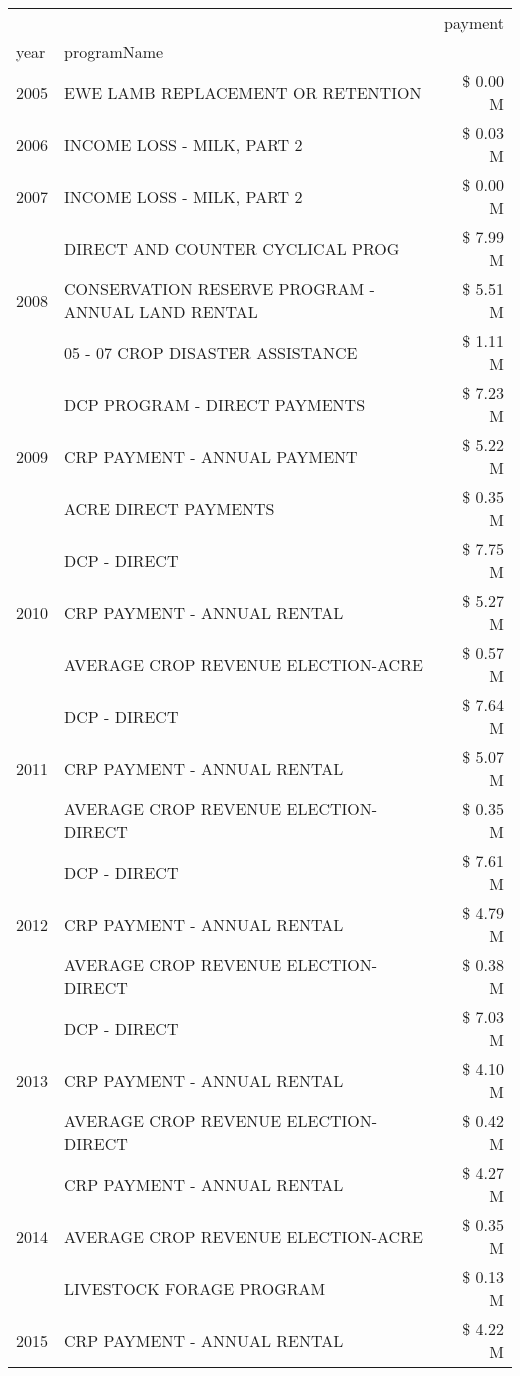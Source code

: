 \begin{tabular}{llr}
\toprule
 &  & payment \\
year & programName &  \\
\midrule
2005 & EWE LAMB REPLACEMENT OR RETENTION & \$ 0.00 M \\
\cline{1-3}
2006 & INCOME LOSS - MILK, PART 2 & \$ 0.03 M \\
\cline{1-3}
2007 & INCOME LOSS - MILK, PART 2 & \$ 0.00 M \\
\cline{1-3}
\multirow[t]{3}{*}{2008} & DIRECT AND COUNTER CYCLICAL PROG & \$ 7.99 M \\
 & CONSERVATION RESERVE PROGRAM - ANNUAL LAND RENTAL & \$ 5.51 M \\
 & 05 - 07 CROP DISASTER ASSISTANCE & \$ 1.11 M \\
\cline{1-3}
\multirow[t]{3}{*}{2009} & DCP PROGRAM - DIRECT PAYMENTS & \$ 7.23 M \\
 & CRP PAYMENT - ANNUAL PAYMENT & \$ 5.22 M \\
 & ACRE DIRECT PAYMENTS & \$ 0.35 M \\
\cline{1-3}
\multirow[t]{3}{*}{2010} & DCP - DIRECT & \$ 7.75 M \\
 & CRP PAYMENT - ANNUAL RENTAL & \$ 5.27 M \\
 & AVERAGE CROP REVENUE ELECTION-ACRE & \$ 0.57 M \\
\cline{1-3}
\multirow[t]{3}{*}{2011} & DCP - DIRECT & \$ 7.64 M \\
 & CRP PAYMENT - ANNUAL RENTAL & \$ 5.07 M \\
 & AVERAGE CROP REVENUE ELECTION-DIRECT & \$ 0.35 M \\
\cline{1-3}
\multirow[t]{3}{*}{2012} & DCP - DIRECT & \$ 7.61 M \\
 & CRP PAYMENT - ANNUAL RENTAL & \$ 4.79 M \\
 & AVERAGE CROP REVENUE ELECTION-DIRECT & \$ 0.38 M \\
\cline{1-3}
\multirow[t]{3}{*}{2013} & DCP - DIRECT & \$ 7.03 M \\
 & CRP PAYMENT - ANNUAL RENTAL & \$ 4.10 M \\
 & AVERAGE CROP REVENUE ELECTION-DIRECT & \$ 0.42 M \\
\cline{1-3}
\multirow[t]{3}{*}{2014} & CRP PAYMENT - ANNUAL RENTAL & \$ 4.27 M \\
 & AVERAGE CROP REVENUE ELECTION-ACRE & \$ 0.35 M \\
 & LIVESTOCK FORAGE PROGRAM & \$ 0.13 M \\
\cline{1-3}
\multirow[t]{3}{*}{2015} & CRP PAYMENT - ANNUAL RENTAL & \$ 4.22 M \\

\end{tabular}

